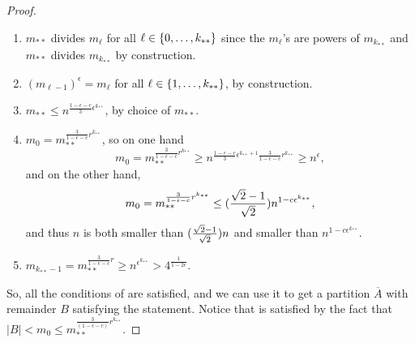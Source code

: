 \begin{theorem}
\begin{proof}
\begin{enumerate}
                    \item $m_{**}$ divides $m_\ell$ for all $\ell \in \{ 0, \dots, k_{**} \}$ since the $m_\ell$'s are powers of $m_{k_{**}}$
                        and $m_{**}$ divides $m_{k_{**}}$ by construction.
                    \item $(m_{\ell-1})^\epsilon = m_\ell$ for all $\ell \in \{ 1, \dots, k_{**} \}$, by construction.
                    \item $m_{**} \leq n^{\frac{1-\epsilon-c}{3}\epsilon^{k_{**}}}$, by choice of $m_{**}$.
                    \item $m_0 = m_{**}^{\frac{3}{1-\epsilon-c}r^{k_{**}}}$, so on one hand
                        \[
                            m_0 = m_{**}^{\frac{3}{1-\epsilon-c}r^{k_{**}}} \geq n^{\frac{1-\epsilon-c}{3}\epsilon^{k_{**}+1} \frac{3}{1-\epsilon-c}r^{k_{**}}}
                                \geq n^{\epsilon},
                        \]
                        and on the other hand,
                        \[
                            m_0 = m_{**}^{\frac{3}{1-\epsilon-c}r^{k_{**}}} \leq ( \frac{\sqrt{2}-1}{\sqrt{2}} ) n^{1 - c \epsilon^{k_{**}}},
                        \]
                        and thus $n$ is both smaller than $( \frac{\sqrt{2}-1}{\sqrt{2}} ) n$ and
                        smaller than $n^{1 - c \epsilon^{k_{**}}}$.
                    \item $m_{k_{**}-1} = m_{**}^{\frac{3}{1-\epsilon-c}r} \geq n^{\epsilon^{k_{**}}} > 4^{\frac{1}{1-2\epsilon}}$.
                \end{enumerate}
                So, all the conditions of  are satisfied,
                and we can use it to get a partition $\overline{A}$ with remainder $B$ satisfying the statement.
                Notice that 
                is satisfied by the fact that $|B| < m_0 \leq m_{**}^{\frac{3}{(1-\epsilon-c)}r^{k_{**}}}$.
            \end{proof}
        \end{theorem}

